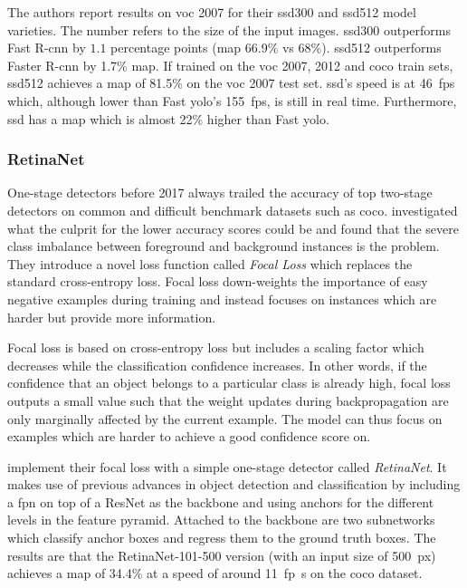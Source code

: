 \documentclass[draft,final]{vutinfth} %
\begin{document}
The authors report results on \gls{voc} 2007 for their \gls{ssd}300
and \gls{ssd}512 model varieties. The number refers to the size of the
input images. \gls{ssd}300 outperforms Fast R-\gls{cnn} by $1.1$
percentage points (\gls{map} 66.9\% vs 68\%). \gls{ssd}512 outperforms
Faster R-\gls{cnn} by 1.7\% \gls{map}. If trained on the \gls{voc}
2007, 2012 and \gls{coco} train sets, \gls{ssd}512 achieves a
\gls{map} of 81.5\% on the \gls{voc} 2007 test set. \gls{ssd}'s speed
is at \qty{46}{fps} which, although lower than Fast \gls{yolo}'s
\qty{155}{fps}, is still in real time. Furthermore, \gls{ssd} has a
\gls{map} which is almost 22\% higher than Fast \gls{yolo}.

\subsubsection{RetinaNet}
\label{sssec:theory-retinanet}

One-stage detectors before 2017 always trailed the accuracy of top
two-stage detectors on common and difficult benchmark datasets such
as \gls{coco}. \textcite{lin2017b} investigated what the culprit for
the lower accuracy scores could be and found that the severe class
imbalance between foreground and background instances is the
problem. They introduce a novel loss function called \emph{Focal Loss}
which replaces the standard cross-entropy loss. Focal loss
down-weights the importance of easy negative examples during training
and instead focuses on instances which are harder but provide more
information.

Focal loss is based on cross-entropy loss but includes a scaling
factor which decreases while the classification confidence
increases. In other words, if the confidence that an object belongs to
a particular class is already high, focal loss outputs a small value
such that the weight updates during backpropagation are only
marginally affected by the current example. The model can thus focus
on examples which are harder to achieve a good confidence score on.

\textcite{lin2017b} implement their focal loss with a simple one-stage
detector called \emph{RetinaNet}. It makes use of previous advances in
object detection and classification by including a \gls{fpn} on top of
a ResNet \cite{he2016} as the backbone and using anchors for the
different levels in the feature pyramid. Attached to the backbone are
two subnetworks which classify anchor boxes and regress them to the
ground truth boxes. The results are that the RetinaNet-101-500 version
(with an input size of \qty{500}{px}) achieves a \gls{map} of 34.4\%
at a speed of around \qty{11}{fp\s} on the \gls{coco} dataset.
\end{document}
